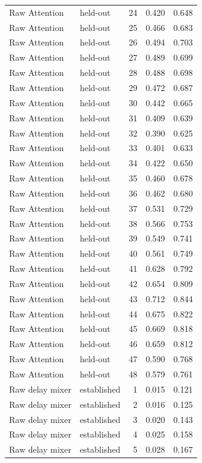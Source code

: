 \begin{tabular}{llrrr}
Raw Attention & held-out & 24 & 0.420 & 0.648 \\
Raw Attention & held-out & 25 & 0.466 & 0.683 \\
Raw Attention & held-out & 26 & 0.494 & 0.703 \\
Raw Attention & held-out & 27 & 0.489 & 0.699 \\
Raw Attention & held-out & 28 & 0.488 & 0.698 \\
Raw Attention & held-out & 29 & 0.472 & 0.687 \\
Raw Attention & held-out & 30 & 0.442 & 0.665 \\
Raw Attention & held-out & 31 & 0.409 & 0.639 \\
Raw Attention & held-out & 32 & 0.390 & 0.625 \\
Raw Attention & held-out & 33 & 0.401 & 0.633 \\
Raw Attention & held-out & 34 & 0.422 & 0.650 \\
Raw Attention & held-out & 35 & 0.460 & 0.678 \\
Raw Attention & held-out & 36 & 0.462 & 0.680 \\
Raw Attention & held-out & 37 & 0.531 & 0.729 \\
Raw Attention & held-out & 38 & 0.566 & 0.753 \\
Raw Attention & held-out & 39 & 0.549 & 0.741 \\
Raw Attention & held-out & 40 & 0.561 & 0.749 \\
Raw Attention & held-out & 41 & 0.628 & 0.792 \\
Raw Attention & held-out & 42 & 0.654 & 0.809 \\
Raw Attention & held-out & 43 & 0.712 & 0.844 \\
Raw Attention & held-out & 44 & 0.675 & 0.822 \\
Raw Attention & held-out & 45 & 0.669 & 0.818 \\
Raw Attention & held-out & 46 & 0.659 & 0.812 \\
Raw Attention & held-out & 47 & 0.590 & 0.768 \\
Raw Attention & held-out & 48 & 0.579 & 0.761 \\
Raw delay mixer & established & 1 & 0.015 & 0.121 \\
Raw delay mixer & established & 2 & 0.016 & 0.125 \\
Raw delay mixer & established & 3 & 0.020 & 0.143 \\
Raw delay mixer & established & 4 & 0.025 & 0.158 \\
Raw delay mixer & established & 5 & 0.028 & 0.167 \\

\end{tabular}
